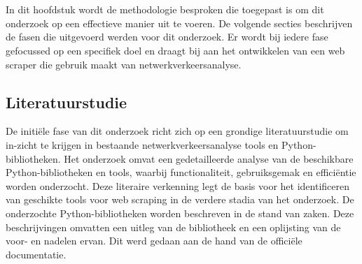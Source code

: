 
\chapter{}%
\label{ch:methodologie}


In dit hoofdstuk wordt de methodologie besproken die toegepast is om dit onderzoek op een effectieve manier uit te voeren. De volgende secties beschrijven de fasen die uitgevoerd werden voor dit onderzoek. Er wordt bij iedere fase gefocussed op een specifiek doel en draagt bij aan het ontwikkelen van een web scraper die gebruik maakt van netwerkverkeersanalyse.

\section{Literatuurstudie}
De initiële fase van dit onderzoek richt zich op een grondige literatuurstudie om in-zicht te krijgen in bestaande netwerkverkeersanalyse tools en Python-bibliotheken. Het onderzoek omvat een gedetailleerde analyse van de beschikbare Python-bibliotheken en tools, waarbij functionaliteit, gebruiksgemak en efficiëntie worden onderzocht. Deze literaire verkenning legt de basis voor het identificeren van geschikte tools voor web scraping in de verdere stadia van het onderzoek. De onderzochte Python-bibliotheken worden beschreven in de stand van zaken. Deze beschrijvingen omvatten een uitleg van de bibliotheek en een oplijsting van de voor- en nadelen ervan. Dit werd gedaan aan de hand van de officiële documentatie.

